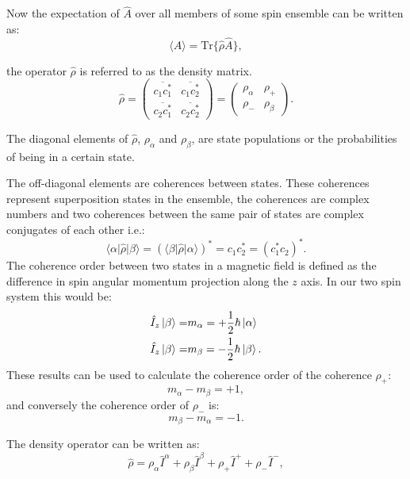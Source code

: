 Now the expectation of $\hat{A}$ over all members of some spin ensemble can be written as:
\begin{equation}
  \langle{A}\rangle = \text{Tr}\{\hat{\rho}\hat{A}\},
\end{equation}

the operator $\hat{\rho}$ is referred to as the density matrix.
\begin{equation}\label{eqn:density}
  \hat{\rho} = \begin{pmatrix}
      \overline{c_1c_1^*} & \overline{c_1c_2^*}\\
      \overline{c_2c_1^*} & \overline{c_2c_2^*}
  \end{pmatrix} = \begin{pmatrix}
      \rho_\alpha & \rho_+\\
      \rho_- & \rho_\beta
  \end{pmatrix}.
\end{equation}

The diagonal elements of $\hat{\rho}$, $\rho_\alpha$ and $\rho_\beta$, are state populations or the probabilities of being in a certain state.

The off-diagonal elements are coherences between states. These coherences represent superposition states in the ensemble,
the coherences are complex numbers and two coherences between the same pair of states are complex conjugates of each other i.e.:
\begin{equation}
  \langle\alpha\vert\hat\rho\vert\beta\rangle = (\langle\beta\vert\hat\rho\vert\alpha\rangle)^* = c_1c_2^* = (c_1^*c_2)^*.
\end{equation}
The coherence order between two states in a magnetic field is defined as the difference in spin angular
momentum projection along the $z$ axis. In our two spin system this would be:
\begin{align}
  \hat{I}_z\ket{\beta} =& m_\alpha = +\frac{1}{2}\hbar\ket{\alpha}\\
  \hat{I}_z\ket{\beta} =& m_\beta = -\frac{1}{2}\hbar\ket{\beta}.
\end{align}
These results can be used to calculate the coherence order of the coherence $\rho_+$:
\begin{equation}
 m_\alpha - m_\beta = +1,
\end{equation}
and conversely the coherence order of $\rho_-$ is:
\begin{equation}
  m_\beta - m_\alpha = -1.
\end{equation}

The density operator can be written as:
\begin{equation}
  \hat{\rho} = \rho_\alpha\hat{I}^\alpha + \rho_\beta\hat{I}^\beta + \rho_+\hat{I}^+ + \rho_-\hat{I}^-,
\end{equation}

